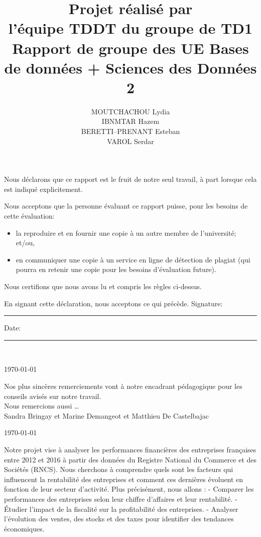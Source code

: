 \documentclass[mstat,12pt]{unswthesis}
\title{Projet réalisé par\\[0.5cm] l'équipe TDDT du groupe de TD1 \\[3cm]Rapport
de groupe des UE \newline  Bases de données + Sciences des Données 2}
\author{
  \begin{tabular}{c}
  MOUTCHACHOU Lydia \\
  IBNMTAR Hazem \\
  BERETTI--PRENANT Esteban \\
  VAROL Serdar
  \end{tabular}
}
\begin{document}
\beforepreface





\vskip 2pc \noindent Nous déclarons que ce rapport est le fruit de notre seul travail, à part lorsque cela est indiqué  explicitement. 

\vskip 2pc  \noindent Nous acceptons que la personne évaluant ce rapport puisse, pour les besoins de cette évaluation:
\begin{itemize}
\item la reproduire et en fournir une copie à un autre membre de l'université; et/ou,
\item en communiquer une copie à un service en ligne de détection de plagiat (qui pourra en retenir une copie pour les besoins d'évaluation future).
\end{itemize}

\vskip 2pc \noindent Nous certifions que nous avons lu et compris les règles ci-dessus.\vspace{24pt}

\vskip 2pc \noindent En signant cette déclaration, nous acceptons ce qui précède.
\vskip 2pc \noindent
Signature: \rule{7cm}{0.25pt} \hfill Date: \rule{4cm}{0.25pt} \\[1cm]
\vskip 1pc


{\bigskip\bigskip\bigskip\noindent} \today






{\bigskip}  Nos plus sincères remerciements vont à notre encadrant
pédagogique pour les conseils avisés sur notre travail.\\[1cm]
  Nous remercions aussi \ldots{}\\[1cm]

Sandra Bringay et Marine Demangeot et Matthieu De Castelbajac

{\bigskip\bigskip\bigskip\noindent} \today




Notre projet vise à analyser les performances financières des
entreprises françaises entre 2012 et 2016 à partir des données du
Registre National du Commerce et des Sociétés (RNCS). Nous cherchons à
comprendre quels sont les facteurs qui influencent la rentabilité des
entreprises et comment ces dernières évoluent en fonction de leur
secteur d'activité. Plus précisément, nous allons : - Comparer les
performances des entreprises selon leur chiffre d'affaires et leur
rentabilité. - Étudier l'impact de la fiscalité sur la profitabilité des
entreprises. - Analyser l'évolution des ventes, des stocks et des taxes
pour identifier des tendances économiques.
\end{document}
